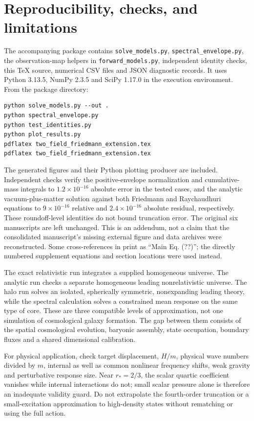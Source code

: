 \documentclass[11pt]{article}
\begin{document}
\section{Reproducibility, checks, and limitations}
The accompanying package contains \texttt{solve\_models.py}, \texttt{spectral\_envelope.py}, the observation-map helpers in \texttt{forward\_models.py}, independent identity checks, this TeX source, numerical CSV files and JSON diagnostic records. It uses Python 3.13.5, NumPy 2.3.5 and SciPy 1.17.0 in the execution environment. From the package directory:
\begin{verbatim}
python solve_models.py --out .
python spectral_envelope.py
python test_identities.py
python plot_results.py
pdflatex two_field_friedmann_extension.tex
pdflatex two_field_friedmann_extension.tex
\end{verbatim}
The generated figures and their Python plotting producer are included. Independent checks verify the positive-envelope normalization and cumulative-mass integrals to $1.2\times10^{-16}$ absolute error in the tested cases, and the analytic vacuum-plus-matter solution against both Friedmann and Raychaudhuri equations to $9\times10^{-16}$ relative and $2.4\times10^{-16}$ absolute residual, respectively. These roundoff-level identities do not bound truncation error. The original six manuscripts are left unchanged. This is an addendum, not a claim that the consolidated manuscript's missing external figure and data archives were reconstructed. Some cross-references in \cite{channelsupp} print as ``Main Eq. (??)''; the directly numbered supplement equations and section locations were used instead.

The exact relativistic run integrates a supplied homogeneous universe. The analytic run checks a separate homogeneous leading nonrelativistic universe. The halo run solves an isolated, spherically symmetric, nonexpanding leading theory, while the spectral calculation solves a constrained mean response on the same type of core. These are three compatible levels of approximation, not one simulation of cosmological galaxy formation. The gap between them consists of the spatial cosmological evolution, baryonic assembly, state occupation, boundary fluxes and a shared dimensional calibration.

For physical application, check target displacement, $H/m$, physical wave numbers divided by $m$, internal as well as common nonlinear frequency shifts, weak gravity and perturbative response size. Near $r_*=2/3$, the scalar quartic coefficient vanishes while internal interactions do not; small scalar pressure alone is therefore an inadequate validity guard. Do not extrapolate the fourth-order truncation or a small-excitation approximation to high-density states without rematching or using the full action.
\end{document}
